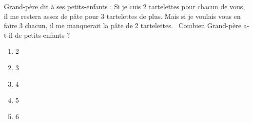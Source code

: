 Grand-père dit à ses petits-enfants : \og Si je cuis 2 tartelettes pour
chacun de vous, il me restera assez de pâte pour 3 tartelettes de
plus. Mais si je voulais vous en faire 3 chacun, il me manquerait la
pâte de 2 tartelettes. \fg\ Combien Grand-père a-t-il de petits-enfants ?
\begin{multicols}{5}
  \begin{enumerate}[A/]
  \item 2
  \item 3
  \item 4
  \item 5
  \item 6
  \end{enumerate}
\end{multicols}